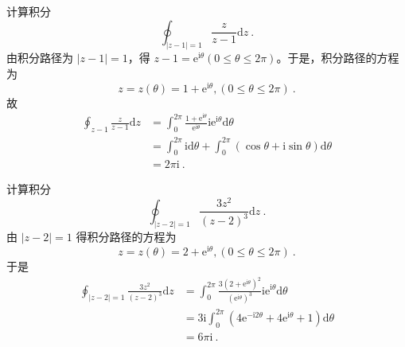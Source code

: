 \begin{example}{}
计算积分
\begin{equation}
\oint_{|z-1|=1} \frac{z}{z-1} \mathrm{d} z~.
\end{equation}
由积分路径为 $|z -1|=1$，得 $z-1=\mathrm{e}^{\mathrm{i} \theta}(0 \leqslant \theta \leqslant 2 \pi)$。于是，积分路径的方程为
\begin{equation}
z=z(\theta)=1+\mathrm{e}^{\mathrm{i} \theta},(0 \leqslant \theta \leqslant 2 \pi)~.
\end{equation}
故
\begin{equation}
\begin{aligned} \oint_{z-1} \frac{z}{z-1} \mathrm{d} z &=\int_{0}^{2 \pi} \frac{1+\mathrm{e}^{\mathrm{i} \theta}}{\mathrm{e}^{\mathrm{i} \theta}} \mathrm{ie}^{\mathrm{i} \theta} \mathrm{d} \theta \\ &=\int_{0}^{2 \pi} \mathrm{id} \theta+\int_{0}^{2 \pi}(\cos \theta+\mathrm{i} \sin \theta) \mathrm{d} \theta \\ &=2 \pi \mathrm{i} ~.\end{aligned}
\end{equation}
\end{example}

\begin{example}{}
计算积分
\begin{equation}
\oint_{|z-2|=1} \frac{3 z^{2}}{(z-2)^{3}} \mathrm{d} z~.
\end{equation}
由 $ |z - 2| =1$ 得积分路径的方程为
\begin{equation}
z=z(\theta)=2+\mathrm{e}^{\mathrm{i} \theta},(0 \leqslant \theta \leqslant 2 \pi)~.
\end{equation}
于是
\begin{equation}
\begin{aligned} \oint_{|z-2|=1} \frac{3 z^{2}}{(z-2)^{3}} \mathrm{d} z &=\int_{0}^{2 \pi} \frac{3\left(2+\mathrm{e}^{\mathrm{i} \theta}\right)^{2}}{\left(\mathrm{e}^{\mathrm{i} \theta}\right)^{3}} \mathrm{ie}^{\mathrm{i} \theta} \mathrm{d} \theta \\ &=3 \mathrm{i} \int_{0}^{2 \pi}\left(4 \mathrm{e}^{-\mathrm{i} 2 \theta}+4 \mathrm{e}^{\mathrm{i} \theta}+1\right) \mathrm{d} \theta \\ &=6 \pi \mathrm{i}~. \end{aligned}
\end{equation}
\end{example}